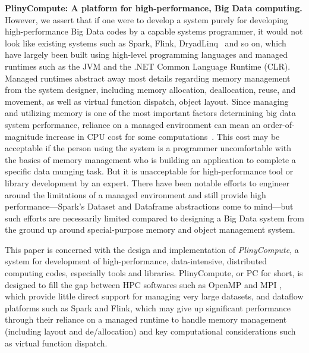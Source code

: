 \vspace{5 pt}
\noindent
\textbf{PlinyCompute: A platform for high-performance, Big Data computing.}
However, we assert that if one were to develop a system purely for developing high-performance
Big Data codes
by a capable systems programmer,
it would not look like existing systems such as Spark, Flink,
DryadLinq~\cite{yu2008dryadlinq} and so on, 
which have largely 
been built using high-level programming languages and managed runtimes
such as the JVM and the .NET Common Language
Runtime (CLR).  Managed runtimes abstract away
most details regarding memory management
from the system designer, including memory allocation, deallocation,
reuse, and movement, as well as virtual function dispatch, 
object layout.
Since managing and utilizing memory is 
one of the most important factors determining big data system performance, reliance
on a managed environment can mean an order-of-magnitude increase in CPU cost for some computations~\cite{blackburn2006dacapo}.  
This cost may be acceptable if the person using the system
is a programmer uncomfortable with the basics of memory management who is
building an application to complete a specific data munging task.  
But it is unacceptable for high-performance tool or library
development by an expert. There have been notable efforts to engineer around the limitations of a managed environment and still provide
high performance---Spark's Dataset and
Dataframe abstractions come to mind---but such efforts are necessarily limited compared to
designing a Big Data system from the ground up around special-purpose
memory and object management system.

This paper is concerned with the design and implementation of
\emph{PlinyCompute}, a system for development of
high-performance, data-intensive, distributed computing codes, especially tools and libraries.
PlinyCompute, or PC for short, is designed to fill the gap between
HPC softwares such as OpenMP \cite{dagum1998openmp} and MPI \cite{gropp1996high}, which provide little direct support for
managing very large datasets, and dataflow platforms such as Spark and Flink, which 
may give up significant performance through their reliance on a managed runtime to handle
memory management (including layout and de/allocation) and key computational considerations
such as virtual function dispatch. 

